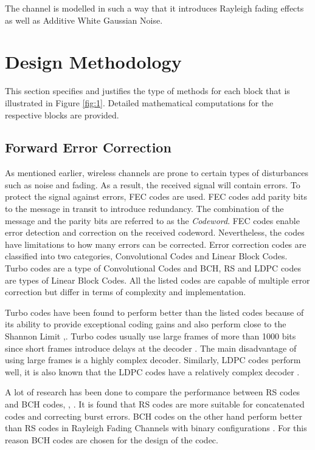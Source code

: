 \documentclass[pdftex,11pt,a4paper]{article}
\begin{document}
The channel is modelled in such a way that it introduces Rayleigh fading effects as well as Additive White Gaussian Noise.

\section{Design Methodology}
This section specifies and justifies the type of methods for each block that is illustrated in Figure \ref{fig:1}. Detailed mathematical computations for the respective blocks are provided.

\subsection{Forward Error Correction}
As mentioned earlier, wireless channels are prone to certain types of disturbances such as noise and fading. As a result, the received signal will contain errors. To protect the signal against errors, FEC codes are used. FEC codes add parity bits to the message in transit to introduce redundancy. The combination of the message and the parity bits are referred to as the \textit{Codeword}. FEC codes enable error detection and correction on the received codeword. Nevertheless, the codes have limitations to how many errors can be corrected. Error correction codes are classified into two categories, Convolutional Codes and Linear Block Codes. Turbo codes are a type of Convolutional Codes and BCH, RS and LDPC codes are types of Linear Block Codes. All the listed codes are capable of multiple error correction but differ in terms of complexity and implementation.

Turbo codes have been found to perform better than the listed codes because of its ability to provide exceptional coding gains and also perform close to the Shannon Limit \cite{18},\cite{18_7}. Turbo codes usually use large frames of more than 1000 bits since short frames introduce delays at the decoder \cite{chris}. The main disadvantage of using large frames is a highly complex decoder. Similarly, LDPC codes perform well, it is also known that the LDPC codes have a relatively complex decoder \cite{7online}.

A lot of research has been done to compare the performance between RS codes and BCH codes\cite{22}, \cite{9}, \cite{24}. It is found that RS codes are more suitable for concatenated codes and correcting burst errors. BCH codes on the other hand perform better than RS codes in Rayleigh Fading Channels with binary configurations \cite{22}. For this reason BCH codes are chosen for the design of the codec.
\end{document}
